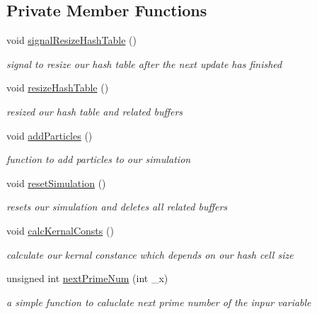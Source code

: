 \subsection*{Private Member Functions}
\begin{DoxyCompactItemize}
\item 
\hypertarget{class_s_p_h_engine_aee1d2a0c0bbc334c35924bc0a8ad8052}{void \hyperlink{class_s_p_h_engine_aee1d2a0c0bbc334c35924bc0a8ad8052}{signal\-Resize\-Hash\-Table} ()}\label{class_s_p_h_engine_aee1d2a0c0bbc334c35924bc0a8ad8052}

\begin{DoxyCompactList}\small\item\em signal to resize our hash table after the next update has finished \end{DoxyCompactList}\item 
\hypertarget{class_s_p_h_engine_a3626e4be502cdce3eb88bcdbf5adb2f6}{void \hyperlink{class_s_p_h_engine_a3626e4be502cdce3eb88bcdbf5adb2f6}{resize\-Hash\-Table} ()}\label{class_s_p_h_engine_a3626e4be502cdce3eb88bcdbf5adb2f6}

\begin{DoxyCompactList}\small\item\em resized our hash table and related buffers \end{DoxyCompactList}\item 
\hypertarget{class_s_p_h_engine_a8d1f44ed34bc68b564f7e5c730288d44}{void \hyperlink{class_s_p_h_engine_a8d1f44ed34bc68b564f7e5c730288d44}{add\-Particles} ()}\label{class_s_p_h_engine_a8d1f44ed34bc68b564f7e5c730288d44}

\begin{DoxyCompactList}\small\item\em function to add particles to our simulation \end{DoxyCompactList}\item 
\hypertarget{class_s_p_h_engine_a5e5a0bc3c47805756cd697a16076800d}{void \hyperlink{class_s_p_h_engine_a5e5a0bc3c47805756cd697a16076800d}{reset\-Simulation} ()}\label{class_s_p_h_engine_a5e5a0bc3c47805756cd697a16076800d}

\begin{DoxyCompactList}\small\item\em resets our simulation and deletes all related buffers \end{DoxyCompactList}\item 
void \hyperlink{class_s_p_h_engine_adaa52f452f1f804bb6a60dea821f2543}{calc\-Kernal\-Consts} ()
\begin{DoxyCompactList}\small\item\em calculate our kernal constance which depends on our hash cell size \end{DoxyCompactList}\item 
unsigned int \hyperlink{class_s_p_h_engine_ac97832913d04297e83c33ada3ae5ae53}{next\-Prime\-Num} (int \-\_\-x)
\begin{DoxyCompactList}\small\item\em a simple function to caluclate next prime number of the inpur variable \end{DoxyCompactList}\end{DoxyCompactItemize}
